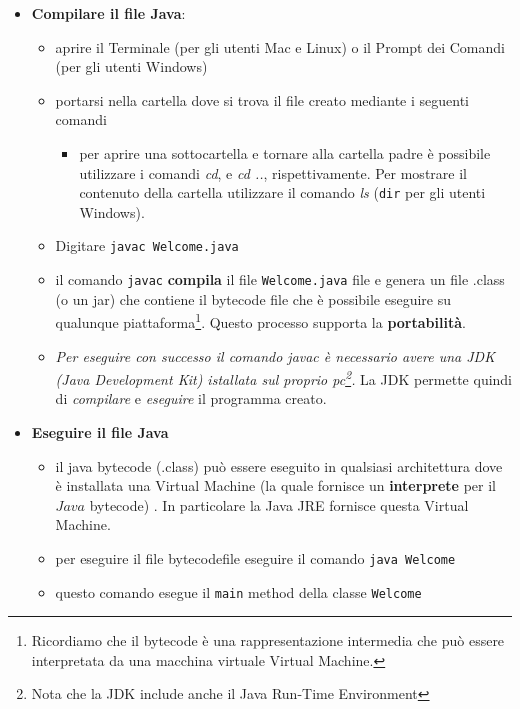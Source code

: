 \documentclass{article}
\theoremstyle{definition}
\begin{document}
\begin{itemize}
\item \textbf{Compilare il file Java}:
\begin{itemize}
\item aprire il Terminale (per gli utenti Mac e Linux) o il Prompt dei Comandi (per gli utenti Windows)
\item portarsi nella cartella dove si trova il file creato mediante i seguenti comandi
\begin{itemize}
\item per aprire una sottocartella e tornare alla cartella padre \`e possibile utilizzare i  comandi \emph{cd}, e \emph{cd ..}, rispettivamente. Per mostrare il contenuto della cartella utilizzare  il comando \emph{ls} (\texttt{dir} per gli utenti Windows).
\end{itemize}
\item Digitare \texttt{javac Welcome.java}
\item il comando \texttt{javac}  \textbf{compila} il file \texttt{Welcome.java} file e genera un file .class (o un jar) che contiene il bytecode file che \`e possibile eseguire su qualunque piattaforma\footnote{Ricordiamo che il bytecode \`e una rappresentazione intermedia che pu\`o essere interpretata da una macchina virtuale Virtual Machine.}. Questo processo supporta la  \textbf{portabilit\`a}. 
\item \emph{Per eseguire con successo il comando \emph{javac} \`e necessario avere una JDK (Java Development Kit) istallata sul proprio pc\footnote{Nota che la JDK include anche il Java Run-Time Environment}.} La JDK permette quindi di  \emph{compilare} e \emph{eseguire} il programma creato.
\end{itemize}
\end{itemize}

\begin{itemize}
\item \textbf{Eseguire il file Java}
\begin{itemize}
\item il java bytecode (.class) pu\`o essere eseguito in qualsiasi architettura dove \`e installata una Virtual Machine (la quale fornisce un  \textbf{interprete} per il $Java$ bytecode) . In particolare la Java JRE fornisce questa Virtual Machine.
\item per eseguire il file bytecodefile eseguire il comando \texttt{java Welcome}
\item questo comando esegue il   \texttt{main} method della classe \texttt{Welcome}
\end{itemize}
\end{itemize}
\end{document}
